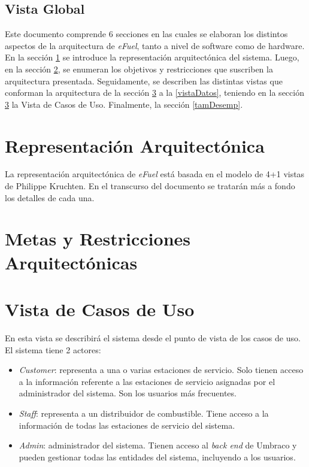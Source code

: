 \documentclass{article}
\begin{document}
    \subsection{Vista Global}
    Este documento comprende 6 secciones en las cuales se elaboran los distintos aspectos de la arquitectura de \emph{eFuel}, tanto a nivel de software como de hardware. En la sección \ref{reprArq} se introduce la representación arquitectónica del sistema. Luego, en la sección \ref{metasArq}, se enumeran los objetivos y restricciones que suscriben la arquitectura presentada. Seguidamente, se describen las distintas vistas que conforman la arquitectura de la sección \ref{vistaCasosDeUso} a la \ref{vistaDatos}, teniendo en la sección \ref{vistaCasosDeUso} la Vista de Casos de Uso. Finalmente, la sección \ref{tamDesemp}.


    \section{Representación Arquitectónica} \label{reprArq}
    La representación arquitectónica de \emph{eFuel} está basada en el modelo de 4+1 vistas de Philippe Kruchten. En el transcurso del documento se tratarán más a fondo los detalles de cada una.

    \section{Metas y Restricciones Arquitectónicas} \label{metasArq}


    \section{Vista de Casos de Uso} \label{vistaCasosDeUso}
    En esta vista se describirá el sistema desde el punto de vista de los casos de uso. El sistema tiene 2 actores:

    \begin{itemize}
        \item \emph{Customer}: representa a una o varias estaciones de servicio. Solo tienen acceso a la información referente a las estaciones de servicio asignadas por el administrador del sistema. Son los usuarios más frecuentes.
        \item \emph{Staff}: representa a un distribuidor de combustible. Tiene acceso a la información de todas las estaciones de servicio del sistema.
        \item \emph{Admin}: administrador del sistema. Tienen acceso al \emph{back end} de Umbraco y pueden gestionar todas las entidades del sistema, incluyendo a los usuarios.
    \end{itemize}
\end{document}
